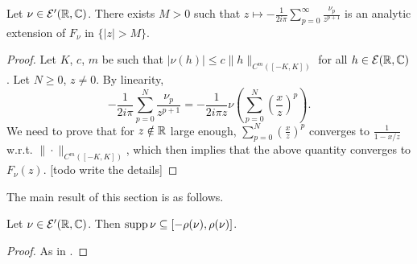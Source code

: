\begin{proposition}
  \label{prop:Stieltjes_expansion}
  \notready
  Let $\nu \in \mathcal{E}'(\mathbb{R}, \mathbb{C})$.
  There exists $M > 0$ such that $z \mapsto -\frac{1}{2 i \pi} \sum_{p=0}^\infty \frac{\nu_p}{z^{p+1}}$
  is an analytic extension of $F_\nu$ in $\{|z| > M\}$.
\end{proposition}

\begin{proof}
  Let $K$, $c$, $m$ be such that $|\nu(h)| \leq c \|h\|_{C^m([-K,K])}$ for all $h \in \mathcal{E}(\mathbb{R}, \mathbb{C})$.
  Let $N \geq 0$, $z \neq 0$. By linearity,
  \begin{equation*}
    -\frac{1}{2i \pi}
    \sum_{p=0}^N \frac{\nu_p}{z^{p+1}}
    = -\frac{1}{2 i \pi z} \nu \left( \sum_{p=0}^N \left(\frac{x}{z}\right)^p \right).
  \end{equation*}
  We need to prove that for $z \notin \mathbb{R}$
  large enough, $\sum_{p=0}^N \left(\frac{x}{z}\right)^p$
  converges to $\frac{1}{1-x/z}$ w.r.t. $\|\cdot\|_{C^m([-K,K])}$,
  which then implies that the above quantity converges to $F_\nu(z)$.
    [todo write the details]
\end{proof}

The main result of this section is as follows.

\begin{theorem}
  \label{thm:support_limsup}
  \notready
  Let $\nu \in \mathcal{E}'(\mathbb{R}, \mathbb{C})$.
  Then $\mathrm{supp} \, \nu \subseteq [-\rho(\nu), \rho(\nu)]$.
\end{theorem}

\begin{proof}
  As in \cite[Lemma 4.9]{chen2025}.
\end{proof}
